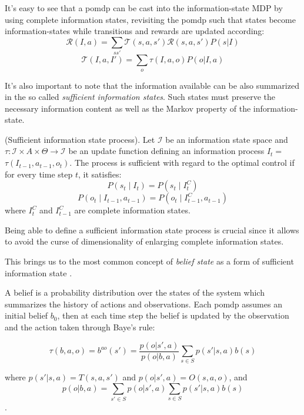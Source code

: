 It's easy to see that a \gls{pomdp} can be cast into the information-state MDP by using complete 
information states, revisiting the \gls{pomdp} such that states become information-states while transitions 
and rewards are updated according:
$$\mathcal{R}(I,a) = \sum_{s s'} \mathcal{T}(s,a,s')\mathcal{R}(s,a,s')P(s|I) $$
$$\mathcal{T}(I,a,I') = \sum_o \tau(I,a,o)P(o|I,a) $$


It's also important to note that the information available can be also summarized in the 
so called \textit{sufficient information states}. Such states must preserve
the necessary information content as well as the Markov property of the information-state.
\begin{definition}
    
    (Sufficient information state process). Let \(\mathcal{I}\) be an information state space 
    and \(\tau: \mathcal{I} \times A \times \Theta \rightarrow \mathcal{I}\) be an update function defining an information process \(I_{t}=\) 
    \(\tau\left(I_{t-1}, a_{t-1}, o_{t}\right)\). The process is sufficient with regard to the optimal control 
    if for every time step $t$, it satisfies:
    $$P\left(s_{t} \mid I_{t}\right)=P\left(s_{t} \mid I_{t}^{C}\right)$$
    $$P\left(o_{t} \mid I_{t-1}, a_{t-1}\right)=P\left(o_{t} \mid I_{t-1}^{C}, a_{t-1}\right)$$
    where \(I_{t}^{C}\) and \(I_{t-1}^{C}\) are complete information states.

\end{definition} 

Being able to define a sufficient information state process is crucial since it allows to avoid 
the curse of dimensionality of enlarging complete information states.

This brings us to the most common concept of \textit{belief state} as a form of sufficient information state
\cite{strm1965OptimalCO}.

A belief is a probability distribution over the states of the system which summarizes the history of 
actions and observations. Each \gls{pomdp} assumes an initial belief $b_0$, then at each time step
the belief is updated by the observation and the action taken through Baye's rule:

$$\tau(b,a,o) = b^{ao}(s')=\displaystyle\frac{p(o|s',a)}{p(o|b,a)}\sum_{s\in S}p(s'|s,a)b(s)$$

where $p(s'|s,a) = T(s,a,s')$ and $p(o|s',a) = O(s,a,o)$, and
$$p(o|b,a)=\displaystyle\sum_{s'\in S}p(o|s',a)\sum_{s\in S}p(s'|s,a)b(s)$$.

